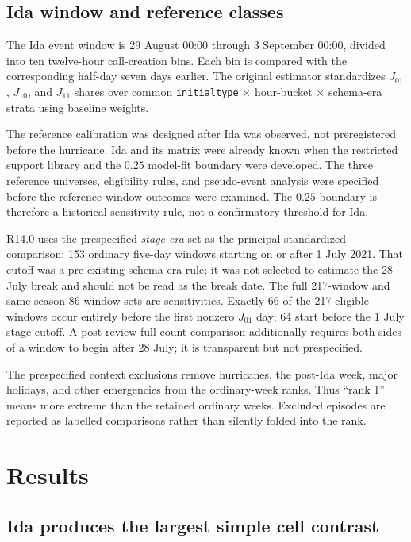 \documentclass[11pt]{article}
\begin{document}
\subsection{Ida window and reference classes}

The Ida event window is 29 August 00:00 through 3 September 00:00, divided into ten twelve-hour call-creation bins. Each bin is compared with the corresponding half-day seven days earlier. The original estimator standardizes $J_{01}$, $J_{10}$, and $J_{11}$ shares over common \texttt{initialtype} $\times$ hour-bucket $\times$ schema-era strata using baseline weights.

The reference calibration was designed after Ida was observed, not preregistered before the hurricane. Ida and its matrix were already known when the restricted support library and the $0.25$ model-fit boundary were developed. The three reference universes, eligibility rules, and pseudo-event analysis were specified before the reference-window outcomes were examined. The $0.25$ boundary is therefore a historical sensitivity rule, not a confirmatory threshold for Ida.

R14.0 uses the prespecified \emph{stage-era} set as the principal standardized comparison: 153 ordinary five-day windows starting on or after 1 July 2021. That cutoff was a pre-existing schema-era rule; it was not selected to estimate the 28 July break and should not be read as the break date. The full 217-window and same-season 86-window sets are sensitivities. Exactly 66 of the 217 eligible windows occur entirely before the first nonzero $J_{01}$ day; 64 start before the 1 July stage cutoff. A post-review full-count comparison additionally requires both sides of a window to begin after 28 July; it is transparent but not prespecified.

The prespecified context exclusions remove hurricanes, the post-Ida week, major holidays, and other emergencies from the ordinary-week ranks. Thus ``rank 1'' means more extreme than the retained ordinary weeks. Excluded episodes are reported as labelled comparisons rather than silently folded into the rank.

\section{Results}

\subsection{Ida produces the largest simple cell contrast}
\end{document}
